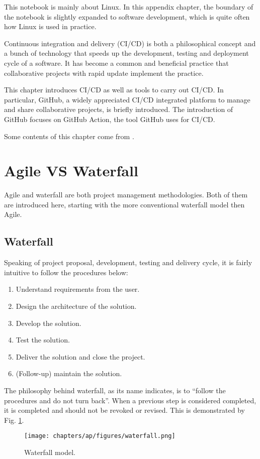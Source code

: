 This notebook is mainly about Linux. In this appendix chapter, the boundary of the notebook is slightly expanded to software development, which is quite often how Linux is used in practice.

Continuous integration and delivery (CI/CD) is both a philosophical concept and a bunch of technology that speeds up the development, testing and deployment cycle of a software. It has become a common and beneficial practice that collaborative projects with rapid update implement the practice.

This chapter introduces CI/CD as well as tools to carry out CI/CD. In particular, GitHub, a widely appreciated CI/CD integrated platform to manage and share collaborative projects, is briefly introduced. The introduction of GitHub focuses on GitHub Action, the tool GitHub uses for CI/CD.

Some contents of this chapter come from \cite{honai2023cicd}.

\section{Agile VS Waterfall}

Agile and waterfall are both project management methodologies. Both of them are introduced here, starting with the more conventional waterfall model then Agile.

\subsection{Waterfall}

Speaking of project proposal, development, testing and delivery cycle, it is fairly intuitive to follow the procedures below:
\begin{enumerate}
	\item Understand requirements from the user.
	\item Design the architecture of the solution.
	\item Develop the solution.
	\item Test the solution.
	\item Deliver the solution and close the project.
	\item (Follow-up) maintain the solution.
\end{enumerate}
The philosophy behind waterfall, as its name indicates, is to ``follow the procedures and do not turn back''. When a previous step is considered completed, it is completed and should not be revoked or revised. This is demonstrated by Fig. \ref{ch:cicd:fig:waterfall}.
\begin{figure}[htbp]
	\centering
	\texttt{[image: chapters/ap/figures/waterfall.png]}
	\caption{Waterfall model.} \label{ch:cicd:fig:waterfall}
\end{figure}

